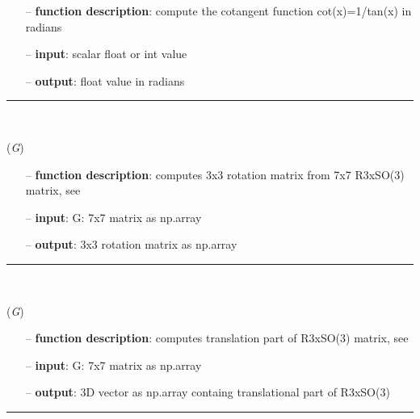 \begin{itemize}[leftmargin=1.4cm]
\begin{itemize}[leftmargin=0.5cm]
\begin{itemize}[leftmargin=1.4cm]
\begin{itemize}[leftmargin=0.5cm]
\begin{itemize}[leftmargin=1.4cm]
\begin{itemize}[leftmargin=0.5cm]
\begin{itemize}[leftmargin=1.4cm]
\begin{itemize}[leftmargin=1.4cm]
\begin{itemize}[leftmargin=1.4cm]
\begin{itemize}[leftmargin=1.4cm]
\begin{itemize}[leftmargin=0.5cm]
\begin{itemize}[leftmargin=0.7cm]
  \item[--]  {\bf function description}: compute the cotangent function cot(x)=1/tan(x) in radians  \item[--]  {\bf input}: scalar float or int value  \item[--]  {\bf output}: float value in radians\vspace{12pt}\end{itemize}
%
\noindent\rule{8cm}{0.75pt}\vspace{1pt} \\ 
\begin{flushleft}
\label{sec:lieGroupBasics:R3xSO3Matrix2RotationMatrix}
({\it G})
\end{flushleft}
\setlength{\itemindent}{0.7cm}
\begin{itemize}[leftmargin=0.7cm]
  \item[--]  {\bf function description}: computes 3x3 rotation matrix from 7x7 R3xSO(3) matrix, see \cite{Bruels2011}  \item[--]  {\bf input}: G: 7x7 matrix as np.array  \item[--]  {\bf output}: 3x3 rotation matrix as np.array\vspace{12pt}\end{itemize}
%
\noindent\rule{8cm}{0.75pt}\vspace{1pt} \\ 
\begin{flushleft}
\label{sec:lieGroupBasics:R3xSO3Matrix2Translation}
({\it G})
\end{flushleft}
\setlength{\itemindent}{0.7cm}
\begin{itemize}[leftmargin=0.7cm]
  \item[--]  {\bf function description}: computes translation part of R3xSO(3) matrix, see \cite{Bruels2011}  \item[--]  {\bf input}: G: 7x7 matrix as np.array  \item[--]  {\bf output}: 3D vector as np.array containg translational part of R3xSO(3)\vspace{12pt}\end{itemize}
%
\noindent\rule{8cm}{0.75pt}\vspace{1pt} \\ 

\end{itemize}
\end{itemize}
\end{itemize}
\end{itemize}
\end{itemize}
\end{itemize}
\end{itemize}
\end{itemize}
\end{itemize}
\end{itemize}
\end{itemize}

